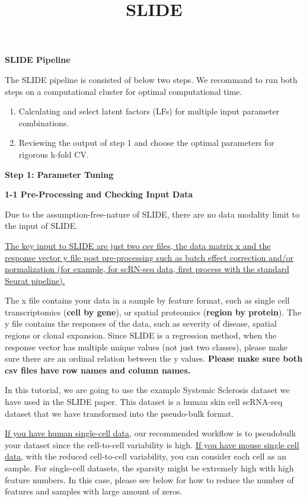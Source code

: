 \documentclass[
]{article}
\title{SLIDE}
\author{}
\date{\vspace{-2.5em}}
\begin{document}
\maketitle

\textbf{SLIDE Pipeline}

The SLIDE pipeline is consisted of below two steps. We recommand to run
both steps on a computational cluster for optimal computational time.

\begin{enumerate}
\def\labelenumi{\arabic{enumi}.}
\item
  Calculating and select latent factors (LFs) for multiple input
  parameter combinations.
\item
  Reviewing the output of step 1 and choose the optimal parameters for
  rigorous k-fold CV.
\end{enumerate}

\textbf{Step 1: Parameter Tuning}

\textbf{1-1 Pre-Processing and Checking Input Data}

Due to the assumption-free-nature of SLIDE, there are no data modality
limit to the input of SLIDE.

\uline{The key input to SLIDE are just two csv files, the data matrix x
and the response vector y file post pre-processing such as batch effect
correction and/or normalization (for example, for scRN-seq data, first
process with the standard Seurat pipeline).}

The x file contains your data in a sample by feature format, such as
single cell transcriptomics (\textbf{cell by gene}), or spatial
proteomics (\textbf{region by protein}). The y file contains the
responses of the data, such as severity of disease, spatial regions or
clonal expansion. Since SLIDE is a regression method, when the response
vector has multiple unique values (not just two classes), please make
sure there are an ordinal relation between the y values. \textbf{Please
make sure both csv files have row names and column names.}

In this tutorial, we are going to use the example Systemic Sclerosis
dataset we have used in the SLIDE paper. This dataset is a human skin
cell scRNA-seq dataset that we have transformed into the pseudo-bulk
format.

\uline{If you have human single-cell data,} our recommended workflow is
to pseudobulk your dataset since the cell-to-cell variability is high.
\uline{If you have mouse single cell data}, with the reduced
cell-to-cell variability, you can consider each cell as an sample. For
single-cell datasets, the sparsity might be extremely high with high
feature numbers. In this case, please see below for how to reduce the
number of features and samples with large amount of zeros.
\end{document}
